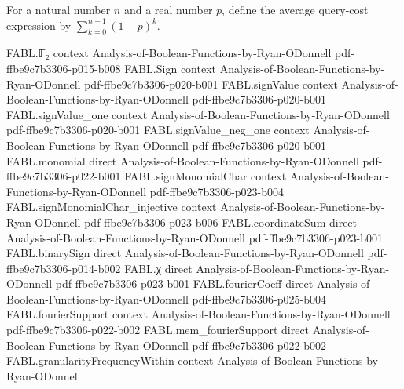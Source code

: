 \begin{definition}
\label{FABL.orAverageQueryCost}
\leanok
For a natural number $n$ and a real number $p$, define the average query-cost expression
by $\sum_{k=0}^{n-1}(1-p)^k$.
\end{definition}

\begin{theorem}
\label{FABL.orAverageQueryCost_eq}
\leanok
{}
\proofstep
  {FABL.𝔽₂}
  {context}
  {Analysis-of-Boolean-Functions-by-Ryan-ODonnell}
  {pdf-ffbe9c7b3306-p015-b008}
\proofstep
  {FABL.Sign}
  {context}
  {Analysis-of-Boolean-Functions-by-Ryan-ODonnell}
  {pdf-ffbe9c7b3306-p020-b001}
\proofstep
  {FABL.signValue}
  {context}
  {Analysis-of-Boolean-Functions-by-Ryan-ODonnell}
  {pdf-ffbe9c7b3306-p020-b001}
\proofstep
  {FABL.signValue_one}
  {context}
  {Analysis-of-Boolean-Functions-by-Ryan-ODonnell}
  {pdf-ffbe9c7b3306-p020-b001}
\proofstep
  {FABL.signValue_neg_one}
  {context}
  {Analysis-of-Boolean-Functions-by-Ryan-ODonnell}
  {pdf-ffbe9c7b3306-p020-b001}
\proofstep
  {FABL.monomial}
  {direct}
  {Analysis-of-Boolean-Functions-by-Ryan-ODonnell}
  {pdf-ffbe9c7b3306-p022-b001}
\proofstep
  {FABL.signMonomialChar}
  {context}
  {Analysis-of-Boolean-Functions-by-Ryan-ODonnell}
  {pdf-ffbe9c7b3306-p023-b004}
\proofstep
  {FABL.signMonomialChar_injective}
  {context}
  {Analysis-of-Boolean-Functions-by-Ryan-ODonnell}
  {pdf-ffbe9c7b3306-p023-b006}
\proofstep
  {FABL.coordinateSum}
  {direct}
  {Analysis-of-Boolean-Functions-by-Ryan-ODonnell}
  {pdf-ffbe9c7b3306-p023-b001}
\proofstep
  {FABL.binarySign}
  {direct}
  {Analysis-of-Boolean-Functions-by-Ryan-ODonnell}
  {pdf-ffbe9c7b3306-p014-b002}
\proofstep
  {FABL.χ}
  {direct}
  {Analysis-of-Boolean-Functions-by-Ryan-ODonnell}
  {pdf-ffbe9c7b3306-p023-b001}
\proofstep
  {FABL.fourierCoeff}
  {direct}
  {Analysis-of-Boolean-Functions-by-Ryan-ODonnell}
  {pdf-ffbe9c7b3306-p025-b004}
\proofstep
  {FABL.fourierSupport}
  {context}
  {Analysis-of-Boolean-Functions-by-Ryan-ODonnell}
  {pdf-ffbe9c7b3306-p022-b002}
\proofstep
  {FABL.mem_fourierSupport}
  {direct}
  {Analysis-of-Boolean-Functions-by-Ryan-ODonnell}
  {pdf-ffbe9c7b3306-p022-b002}
\proofstep
  {FABL.granularityFrequencyWithin}
  {context}
  {Analysis-of-Boolean-Functions-by-Ryan-ODonnell}

\end{theorem}
